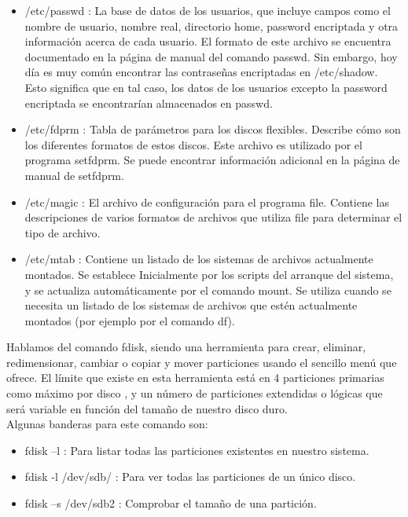 \documentclass[11pt, a4paper]{report}
\begin{document}
\begin{itemize}
\item /etc/passwd : La base de datos de los usuarios, que incluye campos como
  el nombre de usuario, nombre real, directorio home, password encriptada y
  otra información acerca de cada usuario. El formato de este archivo se
  encuentra documentado en la página de manual del comando passwd. Sin
  embargo, hoy día es muy común encontrar las contraseñas encriptadas en
  /etc/shadow. Esto significa que en tal caso, los datos de los usuarios
  excepto la password encriptada se encontrarían almacenados en passwd.
\item /etc/fdprm : Tabla de parámetros para los discos flexibles. Describe
  cómo son los diferentes formatos de estos discos. Este archivo es utilizado
  por el programa setfdprm. Se puede encontrar información adicional en la
  página de manual de setfdprm.
\item /etc/magic : El archivo de configuración para el programa file. Contiene
  las descripciones de varios formatos de archivos que utiliza file para
  determinar el tipo de archivo.
\item /etc/mtab : Contiene un listado de los sistemas de archivos actualmente
  montados. Se establece Inicialmente por los scripts del arranque del sistema, y se actualiza automáticamente por el comando mount. Se utiliza cuando se
  necesita un listado de los sistemas de archivos que estén actualmente
  montados (por ejemplo por el comando df). 
\end{itemize}

Hablamos del comando fdisk, siendo una  herramienta para crear, eliminar,
redimensionar, cambiar o copiar y mover particiones usando el sencillo menú
que ofrece. El límite que existe en esta herramienta está en 4 particiones
primarias como máximo por disco , y un número de particiones extendidas o
lógicas que será variable en función del tamaño de nuestro disco duro. \\

Algunas banderas para este comando son: \\

\begin{itemize}
\item fdisk –l : Para listar todas las particiones existentes en nuestro
  sistema.
\item fdisk -l /dev/sdb/ : Para ver todas las particiones de un único disco.
\item fdisk –s /dev/sdb2 :  Comprobar el tamaño de una partición.    
\end{itemize}
\end{document}
